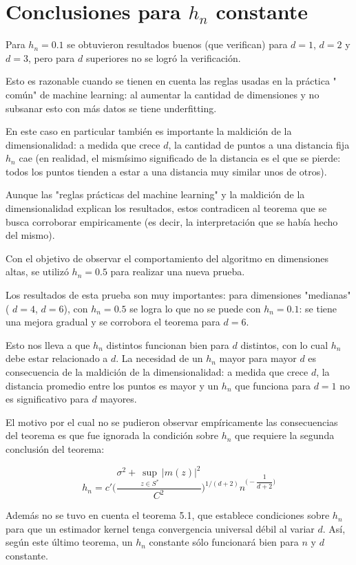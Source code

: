 \documentclass[12pt, a4paper]{article}
\begin{document}
\section{Conclusiones para $h_n$ constante}
Para $h_n=0.1$ se obtuvieron resultados buenos (que verifican) para $d=1$, $d=2$ y $d=3$, pero para $d$ superiores no se logró la verificación. 

Esto es razonable cuando se tienen en cuenta las reglas usadas en la práctica " común" de machine learning: al aumentar la cantidad de dimensiones y no subsanar esto con más datos se tiene underfitting. 

En este caso en particular también es importante la maldición de la dimensionalidad: a medida que crece $d$, la cantidad de puntos a una distancia fija $h_n$ cae (en realidad, el mismísimo significado de la distancia es el que se pierde: todos los puntos tienden a estar a una distancia muy similar unos de otros).

Aunque las "reglas prácticas del machine learning" y la maldición de la dimensionalidad explican los resultados, estos contradicen al teorema que se busca corroborar empiricamente (es decir, la interpretación que se había hecho del mismo).

Con el objetivo de observar el comportamiento del algoritmo en dimensiones altas, se utilizó $h_n=0.5$ para realizar una nueva prueba.

Los resultados de esta prueba son muy importantes: para dimensiones "medianas"  ( $d=4$, $d=6$), con $h_n=0.5$ se logra lo que no se puede con $h_n=0.1$: se tiene una mejora gradual y se corrobora el teorema para $d=6$.

Esto nos lleva a que $h_n$ distintos funcionan bien para $d$ distintos, con lo cual $h_n$ debe estar relacionado a $d$. La necesidad de un $h_n$ mayor para mayor $d$ es consecuencia de la maldición de la dimensionalidad: a medida que crece $d$, la distancia promedio entre los puntos es mayor y un $h_n$ que funciona para $d=1$ no es significativo para $d$ mayores.

El motivo por el cual no se pudieron observar empíricamente las consecuencias del teorema es que fue ignorada la condición sobre $h_n$ que requiere la segunda conclusión del teorema:


$$
h_n = c' \Bigg( \dfrac{\sigma^2 + \mathop{sup}_{z\in S^{*}}|m(z)|^2 }{C^2} \Bigg)^{1/(d+2)} n^{\Big (-\dfrac{1}{d+2}\Big )}
$$

Además no se tuvo en cuenta el teorema 5.1, que establece condiciones sobre $h_n$ para que un estimador kernel tenga convergencia universal débil al variar $d$. Así, según este último teorema, un $h_n$ constante sólo funcionará bien para $n$ y $d$ constante.
\end{document}
